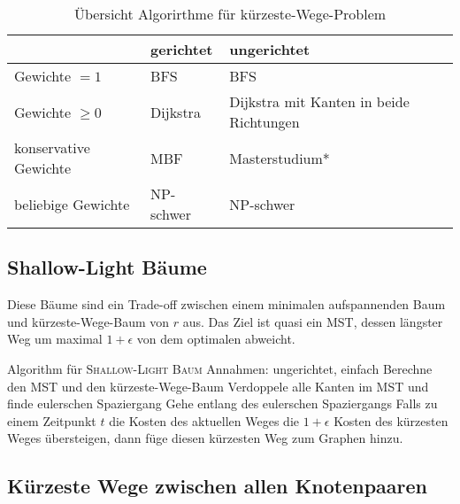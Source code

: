 \begin{table}[h]
    \centering
    \begin{tabular}{m{2.5cm} m{2.5cm} m{5cm}}
        \toprule
         & gerichtet & ungerichtet  \\
         \midrule
         Gewichte $=1$ & BFS & BFS \\
         Gewichte $\geq 0$ & Dijkstra & Dijkstra mit Kanten in beide Richtungen \\
         konservative Gewichte & MBF & Masterstudium*\\
         beliebige Gewichte & NP-schwer & NP-schwer\\ 
         \bottomrule
    \end{tabular}
    \caption{Übersicht Algorirthme für kürzeste-Wege-Problem}
\end{table}



\subsection{Shallow-Light Bäume}

Diese Bäume sind ein Trade-off zwischen einem minimalen aufspannenden Baum und kürzeste-Wege-Baum von $r$ aus. Das Ziel ist quasi ein MST, dessen längster Weg um maximal $1+\epsilon$ von dem optimalen abweicht. 
\begin{outline}
    \1 Algorithm für \textsc{Shallow-Light Baum}
        \2 Annahmen: ungerichtet, einfach
        \2 Berechne den MST und den kürzeste-Wege-Baum
        \2 Verdoppele alle Kanten im MST und finde eulerschen Spaziergang 
        \2 Gehe entlang des eulerschen Spaziergangs
            \3 Falls zu einem Zeitpunkt $t$ die Kosten des aktuellen Weges die $1+\epsilon$ Kosten des kürzesten Weges übersteigen, dann füge diesen kürzesten Weg zum Graphen hinzu. 
\end{outline}

\subsection{Kürzeste Wege zwischen allen Knotenpaaren}

